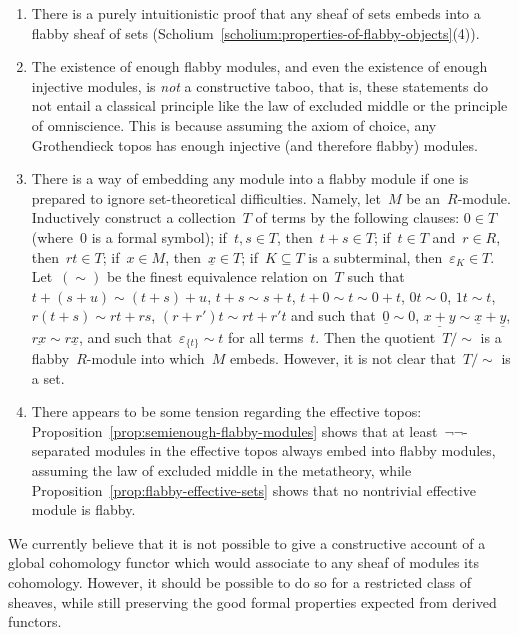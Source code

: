 \documentclass[oneside]{amsart}
\theoremstyle{definition}
\theoremstyle{plain}
\theoremstyle{remark}
\renewcommand{\_}{\mathpunct{.}\,}
\begin{document}
\begin{enumerate}
\item There is a purely intuitionistic proof that any sheaf of sets embeds into
a flabby sheaf of sets
(Scholium~\ref{scholium:properties-of-flabby-objects}(4)).

\item The existence of enough flabby modules, and even the existence of enough
injective modules, is \emph{not} a constructive taboo, that is, these statements do not
entail a classical principle like the law of excluded middle or the principle
of omniscience. This is because assuming the axiom of choice, any
Grothendieck topos has enough injective (and therefore flabby) modules. 

\item There is a way of embedding any module into a flabby module if one is
prepared to ignore set-theoretical difficulties. Namely, let~$M$ be an~$R$-module.
Inductively construct a collection~$T$ of terms by the following clauses: $0
\in T$ (where~$0$ is a formal symbol);
if~$t,s \in T$, then~$t + s \in T$; if~$t \in T$ and~$r \in R$, then~$rt \in
T$; if~$x \in M$, then~$\underline{x} \in T$; if~$K \subseteq T$ is a
subterminal, then~$\varepsilon_K \in T$. Let~$({\sim})$ be
the finest equivalence relation on~$T$ such that~$t + (s + u) \sim (t + s) +
u$, $t + s \sim s + t$, $t + 0 \sim t \sim 0 + t$, $0t \sim 0$, $1t \sim t$, $r(t+s) \sim rt
+ rs$, $(r+r')t \sim rt + r't$ and such
that~$\underline{0} \sim 0$, $\underline{x+y} \sim \underline{x} + \underline{y}$, $\underline{rx} \sim
r \underline{x}$, and such that~$\varepsilon_{\{t\}} \sim
t$ for all terms~$t$. Then the quotient~$T/{\sim}$ is a flabby~$R$-module
into which~$M$ embeds. However, it is not clear that~$T/{\sim}$ is a set.

\item There appears to be some tension regarding the effective topos:
Proposition~\ref{prop:semienough-flabby-modules} shows that at
least~$\neg\neg$-separated modules in the effective topos always embed into
flabby modules, assuming the law of excluded middle in the metatheory, while
Proposition~\ref{prop:flabby-effective-sets} shows that no nontrivial effective
module is flabby.
\end{enumerate}

We currently believe that it is not possible to give a constructive account of
a global cohomology functor which would associate to any sheaf of modules its
cohomology. However, it should be possible to do so for a restricted class of
sheaves, while still preserving the good formal properties expected from
derived functors.

\printbibliography
\end{document}
